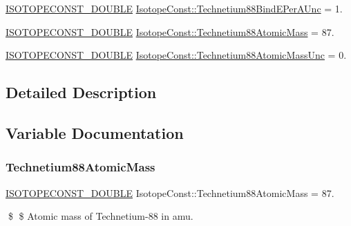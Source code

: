 \begin{DoxyCompactItemize}
\mbox{\hyperlink{group___isotope_const-_macros_ga8f45a7272ce02c0b4c65c44636ed719a}{I\+S\+O\+T\+O\+P\+E\+C\+O\+N\+S\+T\+\_\+\+D\+O\+U\+B\+LE}} \mbox{\hyperlink{group___isotope_const-_technetium-_tc88_ga483441ff42a6a1067bbad39e47290348}{Isotope\+Const\+::\+Technetium88\+Bind\+E\+Per\+A\+Unc}} = 1.
\item 
\mbox{\hyperlink{group___isotope_const-_macros_ga8f45a7272ce02c0b4c65c44636ed719a}{I\+S\+O\+T\+O\+P\+E\+C\+O\+N\+S\+T\+\_\+\+D\+O\+U\+B\+LE}} \mbox{\hyperlink{group___isotope_const-_technetium-_tc88_gaac79872dc36ad10924a1e7f88b80ffec}{Isotope\+Const\+::\+Technetium88\+Atomic\+Mass}} = 87.
\item 
\mbox{\hyperlink{group___isotope_const-_macros_ga8f45a7272ce02c0b4c65c44636ed719a}{I\+S\+O\+T\+O\+P\+E\+C\+O\+N\+S\+T\+\_\+\+D\+O\+U\+B\+LE}} \mbox{\hyperlink{group___isotope_const-_technetium-_tc88_ga4954c3831e7315fb1b17dd7c5e0f5955}{Isotope\+Const\+::\+Technetium88\+Atomic\+Mass\+Unc}} = 0.
\end{DoxyCompactItemize}


\subsection{Detailed Description}


\subsection{Variable Documentation}
\mbox{\label{group___isotope_const-_technetium-_tc88_gaac79872dc36ad10924a1e7f88b80ffec}} 
\subsubsection{\texorpdfstring{Technetium88\+Atomic\+Mass}{Technetium88AtomicMass}}
{\footnotesize\ttfamily \mbox{\hyperlink{group___isotope_const-_macros_ga8f45a7272ce02c0b4c65c44636ed719a}{I\+S\+O\+T\+O\+P\+E\+C\+O\+N\+S\+T\+\_\+\+D\+O\+U\+B\+LE}} Isotope\+Const\+::\+Technetium88\+Atomic\+Mass = 87.}

\$ \$ Atomic mass of Technetium-\/88 in amu. \mbox{\label{group___isotope_const-_technetium-_tc88_ga4954c3831e7315fb1b17dd7c5e0f5955}} 
